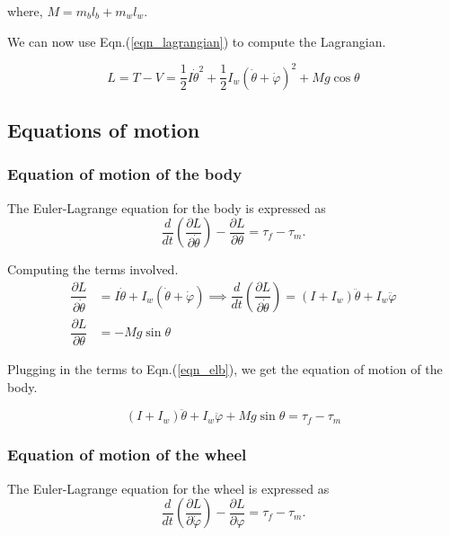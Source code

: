 \documentclass{article}
\begin{document}
where, $M=m_{b}l_{b}+m_{w}l_{w}$.

We can now use Eqn.(\ref{eqn_lagrangian}) to compute the Lagrangian.

\begin{equation}
  L=T-V=\frac{1}{2}I\dot{\theta}^{2}+\dfrac{1}{2}I_{w}(\dot{\theta}+\dot{\varphi})^{2}+Mg\cos\theta
\end{equation}

\subsection{Equations of motion}

\subsubsection*{Equation of motion of the body}

The Euler-Lagrange equation for the body is expressed as
\begin{equation}
  \label{eqn_elb}
  \dfrac{d}{dt}\left( \dfrac{\partial L}{\partial\dot{\theta}} \right)-\dfrac{\partial L}{\partial\theta}=\tau_{f}-\tau_{m}.
\end{equation}

Computing the terms involved.
\begin{equation}
  \begin{split}
    \dfrac{\partial L}{\partial\dot{\theta}}&=I\dot{\theta}+I_{w}(\dot{\theta}+\dot{\varphi})
    \implies\dfrac{d}{dt}\left(\dfrac{\partial L}{\partial\dot{\theta}}\right)=(I+I_{w})\ddot{\theta}+I_{w}\ddot{\varphi}\\
    \dfrac{\partial L}{\partial\theta}&=-Mg\sin\theta
    \end{split}
\end{equation}

Plugging in the terms to Eqn.(\ref{eqn_elb}), we get the equation of motion of the body.

\begin{equation}
  \label{eqn_tempb}
  (I+I_{w})\ddot{\theta}+I_{w}\ddot{\varphi}+Mg\sin\theta=\tau_{f}-\tau_{m}
\end{equation}

\subsubsection*{Equation of motion of the wheel}

The Euler-Lagrange equation for the wheel is expressed as
\begin{equation}
  \label{eqn_elw}
  \dfrac{d}{dt}\left(\dfrac{\partial L}{\partial\dot{\varphi}} \right)-\dfrac{\partial L}{\partial\varphi}=\tau_{f}-\tau_{m}.
\end{equation}
\end{document}
